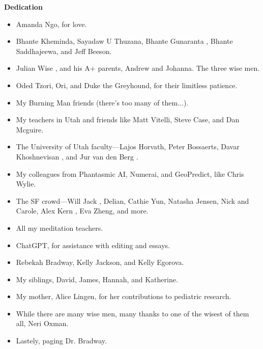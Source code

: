 \begin{titlepage}
    \centering
    {\Huge \bfseries Dedication}\par
    \vspace{2cm}
    \begin{itemize}
        \item Amanda Ngo, for love. \cite{gafori} \cite{bradway} \cite{green}
        \item Bhante Kheminda, Sayadaw U Thuzana, Bhante Gunaranta \cite{guna} \cite{bhavana}, Bhante Saddhajeewa, and Jeff Beeson.
        \item Julian Wise \cite{yale}, and his A+ parents, Andrew and Johanna. The three wise men.
        \item Oded Tzori, Ori, and Duke the Greyhound, for their limitless patience.
        \item My Burning Man friends (there's too many of them...).
        \item My teachers in Utah and friends like Matt Vitelli, Steve Case, and Dan Mcguire.
        \item The University of Utah faculty—Lajos Horvath, Peter Bossaerts, Davar Khoshnevisan \cite{davar}, and Jur van den Berg \cite{utah}.
        \item My colleagues from Phantasmic AI, Numerai, and GeoPredict, like Chris Wylie.
        \item The SF crowd—Will Jack \cite{mit}, Delian, Cathie Yun, Natasha Jensen, Nick and Carole, Alex Kern \cite{berkeley}, Eva Zheng, and more.
        \item All my meditation teachers.
        \item ChatGPT, for assistance with editing and essays.
        \item Rebekah Bradway, Kelly Jackson, and Kelly Egorova.
        \item My siblings, David, James, Hannah, and Katherine.
        \item My mother, Alice Lingen, for her contributions to pediatric research.
        \item While there are many wise men, many thanks to one of the wisest of them all, Neri Oxman.
        \item Lastely, paging Dr. Bradway.
    \end{itemize}
    \vfill
\end{titlepage}

